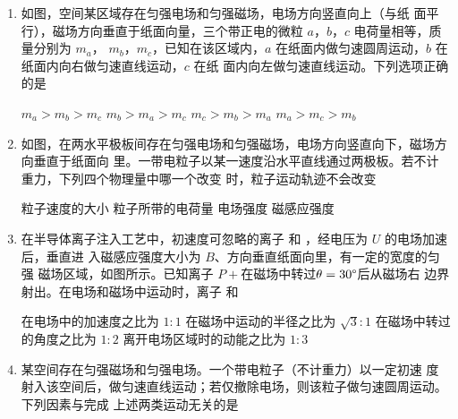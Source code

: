 
\begin{enumerate}
\item
{}
如图，空间某区域存在匀强电场和匀强磁场，电场方向竖直向上（与纸
面平行），磁场方向垂直于纸面向量，三个带正电的微粒 $ a $，$ b $，$ c $ 电荷量相等，质量分别为 $ m_{a} $，
$ m_{b} $，$ m_{c} $，已知在该区域内，$ a $ 在纸面内做匀速圆周运动，$ b $ 在纸面内向右做匀速直线运动，$ c $ 在纸
面内向左做匀速直线运动。下列选项正确的是  
\begin{figure}[h!]
	\centering
	
\end{figure}

\fourchoices
{$ m_{a} > m_{b} > m_{c} $}
{$ m_{b} > m_{a} > m_{c} $}
{$ m_{c} > m_{b} > m_{a} $}
{$ m_{a} > m_{c} > m_{b} $}




\item 
{}
如图，在两水平极板间存在匀强电场和匀强磁场，电场方向竖直向下，磁场方向垂直于纸面向
里。一带电粒子以某一速度沿水平直线通过两极板。若不计重力，下列四个物理量中哪一个改变
时，粒子运动轨迹不会改变  
\begin{figure}[h!]
	\centering
	
\end{figure}

\fourchoices
{粒子速度的大小}
{粒子所带的电荷量}
{电场强度}
{磁感应强度}


\item 
{}
在半导体离子注入工艺中，初速度可忽略的离子    和   ，经电压为 $ U $ 的电场加速后，垂直进
入磁感应强度大小为 $ B $、方向垂直纸面向里，有一定的宽度的匀强
磁场区域，如图所示。已知离子 $ P+ $在磁场中转过$ \theta =30 \degree $后从磁场右
边界射出。在电场和磁场中运动时，离子    和     
\begin{figure}[h!]
	\centering
	
\end{figure}

\fourchoices
{在电场中的加速度之比为 $ 1:1 $}
{在磁场中运动的半径之比为 $ \sqrt{3}:1 $}
{在磁场中转过的角度之比为 $ 1:2 $}
{离开电场区域时的动能之比为 $ 1:3 $}

\item 
{}
某空间存在匀强磁场和匀强电场。一个带电粒子（不计重力）以一定初速
度射入该空间后，做匀速直线运动；若仅撤除电场，则该粒子做匀速圆周运动。下列因素与完成
上述两类运动无关的是   


\end{enumerate}
